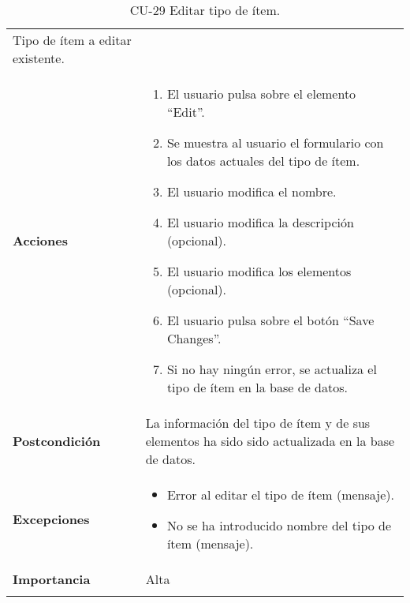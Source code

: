 \begin{longtable}[]{@{}ll@{}}
\begin{minipage}[t]{0.75\columnwidth}
Tipo de ítem a editar existente.\strut
\end{minipage}\tabularnewline
\begin{minipage}[t]{0.20\columnwidth}\raggedright
\textbf{Acciones}\strut
\end{minipage} & \begin{minipage}[t]{0.75\columnwidth}\raggedright
\begin{enumerate}
\def\labelenumi{\arabic{enumi}.}
\tightlist
\item
  El usuario pulsa sobre el elemento ``Edit''.
\item
  Se muestra al usuario el formulario con los datos actuales del tipo de
  ítem.
\item
  El usuario modifica el nombre.
\item
  El usuario modifica la descripción (opcional).
\item
  El usuario modifica los elementos (opcional).
\item
  El usuario pulsa sobre el botón ``Save Changes''.
\item
  Si no hay ningún error, se actualiza el tipo de ítem en la base de
  datos.
\end{enumerate}\strut
\end{minipage}\tabularnewline
\begin{minipage}[t]{0.20\columnwidth}\raggedright
\textbf{Postcondición}\strut
\end{minipage} & \begin{minipage}[t]{0.75\columnwidth}\raggedright
La información del tipo de ítem y de sus elementos ha sido sido
actualizada en la base de datos.\strut
\end{minipage}\tabularnewline
\begin{minipage}[t]{0.20\columnwidth}\raggedright
\textbf{Excepciones}\strut
\end{minipage} & \begin{minipage}[t]{0.75\columnwidth}\raggedright
\begin{itemize}
\tightlist
\item
  Error al editar el tipo de ítem (mensaje).
\item
  No se ha introducido nombre del tipo de ítem (mensaje).
\end{itemize}\strut
\end{minipage}\tabularnewline
\begin{minipage}[t]{0.20\columnwidth}\raggedright
\textbf{Importancia}\strut
\end{minipage} & \begin{minipage}[t]{0.75\columnwidth}\raggedright
Alta\strut
\end{minipage}\tabularnewline
\bottomrule
\caption{CU-29 Editar tipo de ítem.}
\end{longtable}

